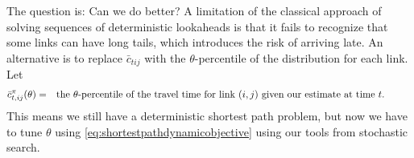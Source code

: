 \documentclass[11pt,oneside,fleqn,reqno,titlepage]{article}
\newcommand{\bn}{\begin{eqnarray}}
\newcommand{\en}{\end{eqnarray}}
\newcommand{\bns}{\begin{eqnarray*}}
\newcommand{\ens}{\end{eqnarray*}}
\newcommand{\textwrap}{\parbox[t]{5.0in}}
\newcommand{\argmax}{{\rm arg}\max}
\def \cbar{\bar c}
\def \Ical{{\cal I}}
\begin{document}
The question is: Can we do better?  A limitation of the classical approach of solving sequences of deterministic lookaheads is that it fails to recognize that some links can have long tails, which introduces the risk of arriving late.  An alternative is to replace $\cbar_{tij}$ with the $\theta$-percentile of the distribution for each link.  Let
\bns
\cbar^\pi_{t,ij}(\theta) &=& \textwrap{the $\theta$-percentile of the travel time for link $(i,j)$ given our estimate at time $t$.}
\ens
This means we still have a deterministic shortest path problem, but now we have to tune $\theta$ using \eqref{eq:shortestpathdynamicobjective} using our tools from stochastic search.





\begin{comment}

\subsection{Dynamic trading policy}
\label{sec:cfadynamictradingpolicy}
We are going to design a policy for trading financial assets.  Let
\bns
\Ical &=& \textwrap{the set of stocks we may hold a position in, with $i=0$ referring to cash,}\\
R_{ti} &=& \textwrap{our position (in shares) in a particular stock $i\in\Ical$, where $R_{ti}$ can be either positive (for a long position) or negative (for a short position), and where $R_{t,0}$ is the amount in cash,}\\
R_t &=& (R_{ti})_{i\in\Ical}.
\ens
Other information variables are
\bns
p_{ti} &=& \textwrap{the price of stock $i$,}\\
p_t &=& (p_{ti})_{i\in\Ical},\\
f_{tt'i} &=& \textwrap{the forecast, generated at time $t$, of the price of stock $i$ at time $t'$ over a horizon $t' = t, \ldots, t+H$,}\\
f_t &=& (f_{tt'i})_{i\in\Ical, t'=t, \ldots, t+H.}
\ens
Our decision variable is
\bns
x_{ti} &=& \textwrap{the number of shares that we trade for each of the stocks. We use $x_{ti}>0$ to represent the number of shares we buy for stock $i$, and  $x_{ti}<0$ to represent a selling decision.}
\ens
The decision is constrained by the requirement that we have enough cash on hand to finance the purchasing decisions, given by
\bns
\sum_{i=1}^M x_{ti}p_{ti} \le R_{t,0}.
\ens
We can now formulate a trading policy
\bn
X^\pi_t(S_t|\theta) \hspace{-.10in}&=&\hspace{-.10in} \argmax_{x_t} \left(\sum_{i=1}^M \left((R_{ti}+x_{ti})(\tilde{f}_{ti}(\theta)-p_{ti})-c^{trans}|x_{ti}|p_{ti}\right) - \rho(R_t+x_t)\right), \nonumber \\
& & \label{eq:tradingpolicy}
\en
where $\tilde{f}_{ti}(\theta)=\sum_{s=1}^H\theta_{s}f_{t,t+s,i}$ represents an overall prediction of the future price using all available forecasts with different horizons and a tunable parameter vector $\theta=(\theta_1,\dots,\theta_H)$. This policy maximizes a utility function that balances the trade-off between return and risk.


\end{comment}
\end{document}
